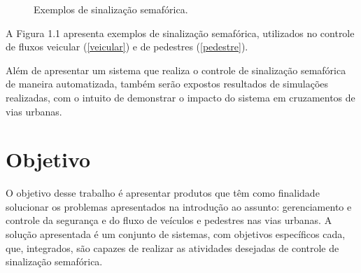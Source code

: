 \begin{figure}[ht]
    \begin{center}
    \caption[Semáforos]{Exemplos de sinalização semafórica.}
    \end{center}
    \label{semaforos}
\end{figure}

A Figura 1.1 apresenta exemplos de sinalização semafórica, utilizados no controle de fluxos veicular (\ref{veicular}) e de pedestres (\ref{pedestre}).

Além de apresentar um sistema que realiza o controle de sinalização semafórica de maneira automatizada, também serão expostos resultados de simulações realizadas, com o intuito de demonstrar o impacto do sistema em cruzamentos de vias urbanas.

\section{Objetivo}

O objetivo desse trabalho é apresentar produtos que têm como finalidade solucionar os problemas apresentados na introdução ao assunto: gerenciamento e controle da segurança e do fluxo de veículos e pedestres nas vias urbanas. A solução apresentada é um conjunto de sistemas, com objetivos específicos cada, que, integrados, são capazes de realizar as atividades desejadas de controle de sinalização semafórica.

